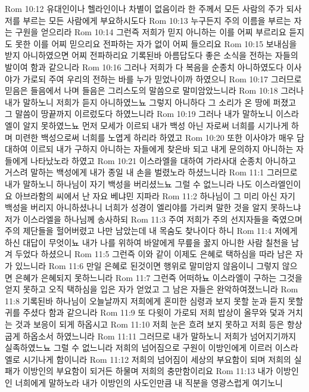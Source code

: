 Rom 10:12  유대인이나 헬라인이나 차별이 없음이라 한 주께서 모든 사람의 주가 되사 저를 부르는 모든 사람에게 부요하시도다
Rom 10:13  누구든지 주의 이름을 부르는 자는 구원을 얻으리라
Rom 10:14  그런즉 저희가 믿지 아니하는 이를 어찌 부르리요 듣지도 못한 이를 어찌 믿으리요 전파하는 자가 없이 어찌 들으리요
Rom 10:15  보내심을 받지 아니하였으면 어찌 전파하리요 기록된바 아름답도다 좋은 소식을 전하는 자들의 발이여 함과 같으니라
Rom 10:16  그러나 저희가 다 복음을 순종치 아니하였도다 이사야가 가로되 주여 우리의 전하는 바를 누가 믿었나이까 하였으니
Rom 10:17  그러므로 믿음은 들음에서 나며 들음은 그리스도의 말씀으로 말미암았느니라
Rom 10:18  그러나 내가 말하노니 저희가 듣지 아니하였느뇨 그렇지 아니하다 그 소리가 온 땅에 퍼졌고 그 말씀이 땅끝까지 이르렀도다 하였느니라
Rom 10:19  그러나 내가 말하노니 이스라엘이 알지 못하였느뇨 먼저 모세가 이르되 내가 백성 아닌 자로써 너희를 시기나게 하며 미련한 백성으로써 너희를 노엽게 하리라 하였고
Rom 10:20  또한 이사야가 매우 담대하여 이르되 내가 구하지 아니하는 자들에게 찾은바 되고 내게 문의하지 아니하는 자들에게 나타났노라 하였고
Rom 10:21  이스라엘을 대하여 가라사대 순종치 아니하고 거스려 말하는 백성에게 내가 종일 내 손을 벌렸노라 하셨느니라
Rom 11:1  그러므로 내가 말하노니 하나님이 자기 백성을 버리셨느뇨 그럴 수 없느니라 나도 이스라엘인이요 아브라함의 씨에서 난 자요 베냐민 지파라
Rom 11:2  하나님이 그 미리 아신 자기 백성을 버리지 아니하셨나니 너희가 성경이 엘리야를 가리켜 말한 것을 알지 못하느냐 저가 이스라엘을 하나님께 송사하되
Rom 11:3  주여 저희가 주의 선지자들을 죽였으며 주의 제단들을 헐어버렸고 나만 남았는데 내 목숨도 찾나이다 하니
Rom 11:4  저에게 하신 대답이 무엇이뇨 내가 나를 위하여 바알에게 무릎을 꿇지 아니한 사람 칠천을 남겨 두었다 하셨으니
Rom 11:5  그런즉 이와 같이 이제도 은혜로 택하심을 따라 남은 자가 있느니라
Rom 11:6  만일 은혜로 된것이면 행위로 말미암지 않음이니 그렇지 않으면 은혜가 은혜되지 못하느니라
Rom 11:7  그런즉 어떠하뇨 이스라엘이 구하는 그것을 얻지 못하고 오직 택하심을 입은 자가 얻었고 그 남은 자들은 완악하여졌느니라
Rom 11:8  기록된바 하나님이 오늘날까지 저희에게 혼미한 심령과 보지 못할 눈과 듣지 못할 귀를 주셨다 함과 같으니라
Rom 11:9  또 다윗이 가로되 저희 밥상이 올무와 덫과 거치는 것과 보응이 되게 하옵시고
Rom 11:10  저희 눈은 흐려 보지 못하고 저희 등은 항상 굽게 하옵소서 하였느니라
Rom 11:11  그러므로 내가 말하노니 저희가 넘어지기까지 실족하였느뇨 그럴 수 없느니라 저희의 넘어짐으로 구원이 이방인에게 이르러 이스라엘로 시기나게 함이니라
Rom 11:12  저희의 넘어짐이 세상의 부요함이 되며 저희의 실패가 이방인의 부요함이 되거든 하물며 저희의 충만함이리요
Rom 11:13  내가 이방인인 너희에게 말하노라 내가 이방인의 사도인만큼 내 직분을 영광스럽게 여기노니
